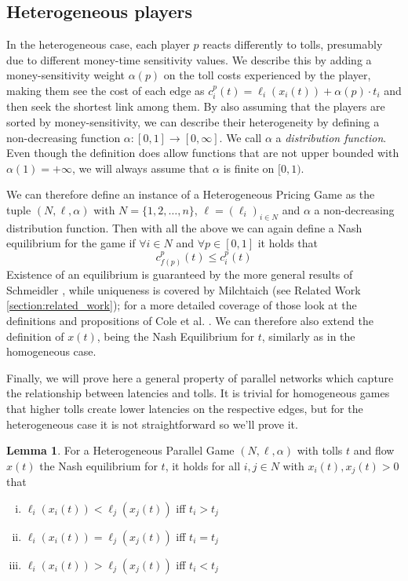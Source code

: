 \documentclass[10pt,a4paper]{book}
\theoremstyle{definition}
\newtheorem{lemma}[definition]{Lemma}
\theoremstyle{comment}
\begin{document}
\subsection*{Heterogeneous players}

In the heterogeneous case, each player $p$ reacts differently to tolls, presumably due to different money-time sensitivity values.
We describe this by adding a money-sensitivity weight $\alpha(p)$ on the toll costs experienced by the player, making them see the cost of each edge as $c_i^p(t) = \ell_i(x_i(t)) + \alpha(p) \cdot t_i$ and then seek the shortest link among them.
By also assuming that the players are sorted by money-sensitivity, we can describe their heterogeneity by defining a non-decreasing function $\alpha: [0, 1] \rightarrow [0, \infty]$.
We call $\alpha$ a \textit{distribution function}.
Even though the definition does allow functions that are not upper bounded with $\alpha(1) = +\infty$, we will always assume that $\alpha$ is finite on $[0, 1)$.

We can therefore define an instance of a Heterogeneous Pricing Game as the tuple $(N, \ell, \alpha)$ with $N = \{1, 2, \dots, n\}$, $\ell = (\ell_i)_{i \in N}$ and $\alpha$ a non-decreasing distribution function.
Then with all the above we can again define a Nash equilibrium for the game if $\forall i \in N$ and $\forall p \in [0, 1]$ it holds that
\[c_{f(p)}^p(t) \leq c_i^p(t)\]
Existence of an equilibrium is guaranteed by the more general results of Schmeidler \cite[Thm 2]{1973JSP.....7..295S}, while uniqueness is covered by Milchtaich \cite[Prop 3.3]{doi:10.1287/moor.25.3.349.12220} (see Related Work \ref{section:related_work}); for a more detailed coverage of those look at the definitions and propositions of Cole et al. \cite[\S2]{10.1145/780542.780618}.
We can therefore also extend the definition of $x(t)$, being the Nash Equilibrium for $t$, similarly as in the homogeneous case.

Finally, we will prove here a general property of parallel networks which capture the relationship between latencies and tolls.
It is trivial for homogeneous games that higher tolls create lower latencies on the respective edges, but for the heterogeneous case it is not straightforward so we'll prove it.

\begin{lemma}
	\label{lemma:latencies_tolls}
	For a Heterogeneous Parallel Game $(N, \ell, \alpha)$ with tolls $t$ and flow $x(t)$ the Nash equilibrium for $t$, it holds for all $i, j \in N$ with $x_i(t), x_j(t) > 0$ that
	\begin{enumerate}[(i)]
		\item $\ell_i(x_i(t)) < \ell_j(x_j(t))$ iff $t_i > t_j$
		\item $\ell_i(x_i(t)) = \ell_j(x_j(t))$ iff $t_i = t_j$
		\item $\ell_i(x_i(t)) > \ell_j(x_j(t))$ iff $t_i < t_j$
	\end{enumerate}
\end{lemma}
\end{document}
